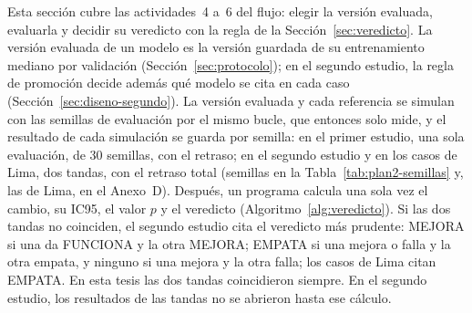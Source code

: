 Esta sección cubre las actividades~4 a~6 del flujo: elegir la versión
evaluada, evaluarla y decidir su veredicto con la regla de la
Sección~\ref{sec:veredicto}. La versión evaluada de un modelo es la
versión guardada de su entrenamiento mediano por validación
(Sección~\ref{sec:protocolo}); en el segundo estudio, la regla de
promoción decide además qué modelo se cita en cada caso
(Sección~\ref{sec:diseno-segundo}). La versión evaluada y cada
referencia se simulan con las semillas de evaluación por el mismo
bucle, que entonces solo mide, y el resultado de cada simulación se
guarda por semilla: en el primer estudio, una sola evaluación, de 30
semillas, con el retraso; en el segundo estudio y en los casos de Lima,
dos tandas, con el retraso total (semillas en la
Tabla~\ref{tab:plan2-semillas} y, las de Lima, en el Anexo~D).
Después, un programa calcula una
sola vez el cambio, su IC95, el valor $p$ y el veredicto
(Algoritmo~\ref{alg:veredicto}). Si las dos tandas no coinciden, el
segundo estudio cita el veredicto más prudente: MEJORA si una da
FUNCIONA y la otra MEJORA; EMPATA si una mejora o falla y la otra
empata, y ninguno si una mejora y la otra falla; los casos de Lima
citan EMPATA. En esta tesis las dos tandas coincidieron siempre. En el
segundo estudio, los resultados de las tandas no se abrieron hasta ese
cálculo.

